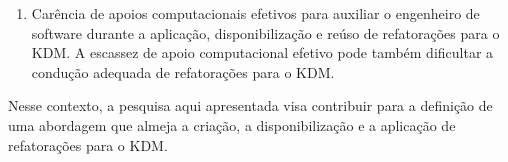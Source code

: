 \begin{enumerate}






\item Carência de apoios computacionais efetivos para auxiliar o engenheiro de software durante a aplicação, disponibilização e reúso de refatorações para o KDM. A escassez de apoio computacional efetivo pode também dificultar a condução adequada de refatorações para o KDM.

\end{enumerate}

Nesse contexto, a pesquisa aqui apresentada visa contribuir para a definição de uma abordagem que almeja a criação, a disponibilização e a aplicação de refatorações para o KDM.


